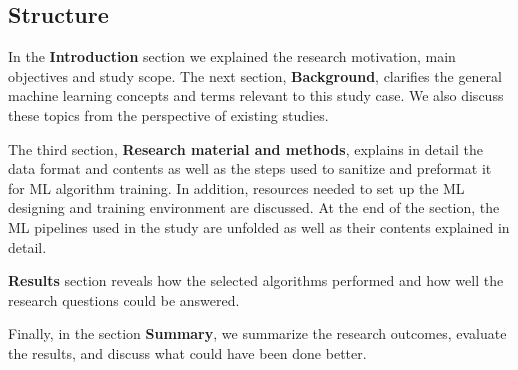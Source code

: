 
\subsection{Structure}\label{subsec:intro-structure}

In the \textbf{Introduction} section
we explained the research motivation,
main objectives and study scope.
The next section, \textbf{Background},
clarifies the general machine learning concepts
and terms relevant to this study case.
We also discuss these topics from the perspective of
existing studies.

The third section,
\textbf{Research material and methods},
explains in detail the data format and contents
as well as the steps used to sanitize and preformat it
for ML algorithm training.
In addition,
resources needed to set up the ML designing and training environment
are discussed.
At the end of the section,
the ML pipelines used in the study are unfolded
as well as their contents explained in detail.

\textbf{Results} section reveals how the selected algorithms performed
and how well the research questions could be answered.

Finally,
in the section \textbf{Summary},
we summarize the research outcomes,
evaluate the results,
and discuss what could have been done better.

\clearpage
